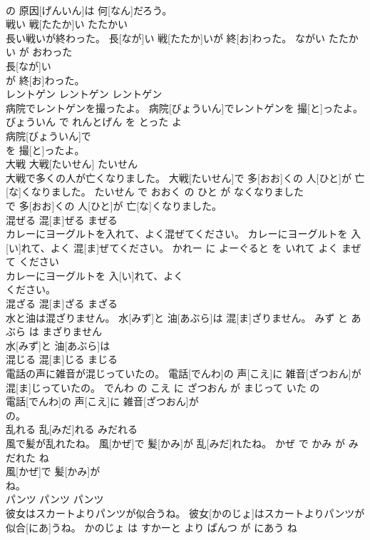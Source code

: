 \documentclass[8pt]{extreport}
\begin{document}
\begin{CJK}{UTF8}{min}
\\	の 原因[げんいん]は 何[なん]だろう。			
\\	戦い	戦[たたか]い	たたかい	
\\	長い戦いが終わった。	長[なが]い 戦[たたか]いが 終[お]わった。	ながい たたかい が おわった	
\\	長[なが]い
\\	が 終[お]わった。			
\\	レントゲン	レントゲン	レントゲン	
\\	病院でレントゲンを撮ったよ。	病院[びょういん]でレントゲンを 撮[と]ったよ。	びょういん で れんとげん を とった よ	
\\	病院[びょういん]で
\\	を 撮[と]ったよ。			
\\	大戦	大戦[たいせん]	たいせん	
\\	大戦で多くの人が亡くなりました。	大戦[たいせん]で 多[おお]くの 人[ひと]が 亡[な]くなりました。	たいせん で おおく の ひと が なくなりました	
\\	で 多[おお]くの 人[ひと]が 亡[な]くなりました。			
\\	混ぜる	混[ま]ぜる	まぜる	
\\	カレーにヨーグルトを入れて、よく混ぜてください。	カレーにヨーグルトを 入[い]れて、よく 混[ま]ぜてください。	かれー に よーぐると を いれて よく まぜて ください	
\\	カレーにヨーグルトを 入[い]れて、よく
\\	ください。			
\\	混ざる	混[ま]ざる	まざる	
\\	水と油は混ざりません。	水[みず]と 油[あぶら]は 混[ま]ざりません。	みず と あぶら は まざりません	
\\	水[みず]と 油[あぶら]は
\\	混じる	混[ま]じる	まじる	
\\	電話の声に雑音が混じっていたの。	電話[でんわ]の 声[こえ]に 雑音[ざつおん]が 混[ま]じっていたの。	でんわ の こえ に ざつおん が まじって いた の	
\\	電話[でんわ]の 声[こえ]に 雑音[ざつおん]が
\\	の。			
\\	乱れる	乱[みだ]れる	みだれる	
\\	風で髪が乱れたね。	風[かぜ]で 髪[かみ]が 乱[みだ]れたね。	かぜ で かみ が みだれた ね	
\\	風[かぜ]で 髪[かみ]が
\\	ね。			
\\	パンツ	パンツ	パンツ	
\\	彼女はスカートよりパンツが似合うね。	彼女[かのじょ]はスカートよりパンツが 似合[にあ]うね。	かのじょ は すかーと より ぱんつ が にあう ね	

\end{CJK}
\end{document}
